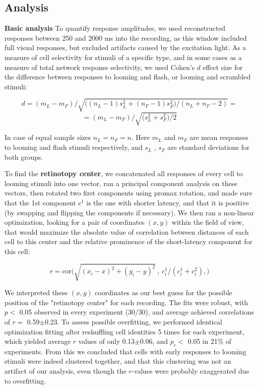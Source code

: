 \documentclass{article}
\begin{document}
\subsection*{Analysis}

\textbf{Basic analysis} To quantify response amplitudes, we used reconstructed responses between 250 and 2000 ms into the recording, as this window included full visual responses, but excluded artifacts caused by the excitation light. As a measure of cell selectivity for stimuli of a specific type, and in some cases as a measure of total network response selectivity, we used Cohen’s $d$ effect size for the difference between responses to looming and flash, or looming and scrambled stimuli:

\[ d = (m_L-m_F)/ \sqrt{ \big((n_L-1) s^2_L + (n_F-1) s^2_F)/(n_L + n_F - 2)} = \]
\[ =(m_L-m_F)/\sqrt{\big(s^2_L+s^2_F\big)/2} \]

In case of equal sample sizes $n_L=n_F=n$. Here $m_L$ and $m_F$ are mean responses to looming and flash stimuli respectively, and $s_L$ , $s_F$ are standard deviations for both groups.

To find the \textbf{retinotopy center}, we concatenated all responses of every cell to looming stimuli into one vector, ran a principal component analysis on these vectors, then rotated two first components using promax rotation, and made sure that the 1st component $c^1$ is the one with shorter latency, and that it is positive (by swapping and flipping the components if necessary). We then ran a non-linear optimization, looking for a pair of coordinates $(x,y)$ within the field of view, that would maximize the absolute value of correlation between distances of each cell to this center and the relative prominence of the short-latency component for this cell:

\[ r = \text{cor}\big(\sqrt{(x_i-x)^2+(y_i-y)^2}\ ,\ c^1_i/(c^1_i + c^2_i), \big) \]

We interpreted these $(x,y)$ coordinates as our best guess for the possible position of the "retinotopy center" for each recording. The fits were robust, with $p<$ 0.05 observed in every experiment (30/30), and average achieved correlations of $r=$ 0.59$\pm$0.23. To assess possible overfitting, we performed identical optimization fitting  after reshuffling cell identities 5 times for each experiment, which yielded average $r$ values of only 0.13$\pm$0.06, and $p_r<$ 0.05 in 21\% of experiments. From this we concluded that cells with early responses to looming stimuli were indeed clustered together, and that this clustering was not an artifact of our analysis, even though the $r$-values were probably exaggerated due to overfitting.
\end{document}
